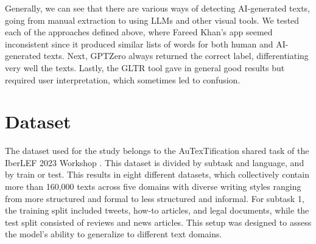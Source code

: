 \documentclass[a4paper,11pt,twocolumn,twoside]{article}
\begin{document}
Generally, we can see that there are various ways of detecting AI-generated texts, going from manual extraction to using LLMs and other visual tools. We tested each of the approaches defined above, where Fareed Khan's app seemed inconsistent since it produced similar lists of words for both human and AI-generated texts. Next, GPTZero always returned the correct label, differentiating very well the texts. Lastly, the GLTR tool gave in general good results but required user interpretation, which sometimes led to confusion.

\section{Dataset}
The dataset used for the study belongs to the AuTexTification shared task of the IberLEF 2023 Workshop \cite{autextification}. This dataset is divided by subtask and language, and by train or test. This results in eight different datasets, which collectively contain more than 160,000 texts across five domains with diverse writing styles ranging from more structured and formal to less structured and informal. For subtask 1, the training split included tweets, how-to articles, and legal documents, while the test split consisted of reviews and news articles. This setup was designed to assess the model's ability to generalize to different text domains.


\end{document}
